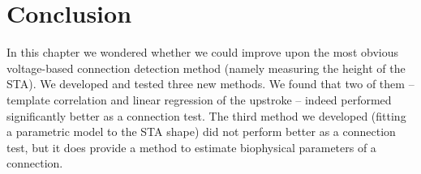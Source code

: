 














\clearpage
\section{Conclusion}

In this chapter we wondered whether we could improve upon the most obvious voltage-based connection detection method (namely measuring the height of the STA). We developed and tested three new methods. We found that two of them -- template correlation and linear regression of the upstroke -- indeed performed significantly better as a connection test. The third method we developed (fitting a parametric model to the STA shape) did not perform better as a connection test, but it does provide a method to estimate biophysical parameters of a connection.
